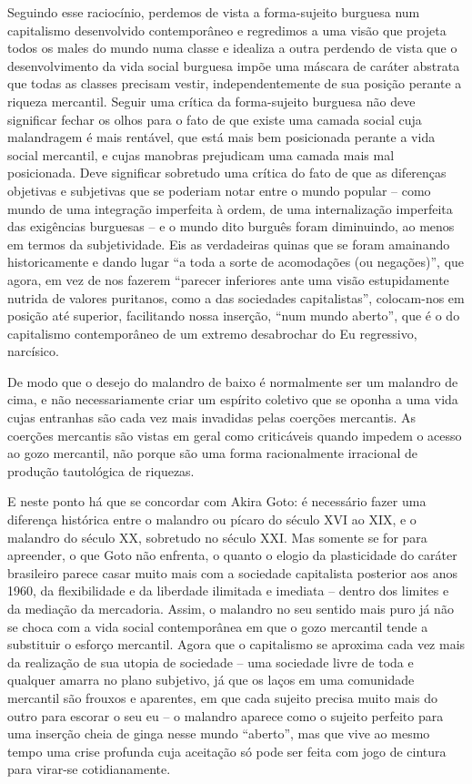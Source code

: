 Seguindo esse raciocínio, perdemos de vista a forma-sujeito burguesa num
capitalismo desenvolvido contemporâneo e regredimos a uma visão que
projeta todos os males do mundo numa classe e idealiza a outra perdendo
de vista que o desenvolvimento da vida social burguesa impõe uma máscara
de caráter abstrata que todas as classes precisam vestir,
independentemente de sua posição perante a riqueza mercantil. Seguir uma
crítica da forma-sujeito burguesa não deve significar fechar os olhos
para o fato de que existe uma camada social cuja malandragem é mais
rentável, que está mais bem posicionada perante a vida social mercantil,
e cujas manobras prejudicam uma camada mais mal posicionada. Deve
significar sobretudo uma crítica do fato de que as diferenças objetivas
e subjetivas que se poderiam notar entre o mundo popular -- como mundo
de uma integração imperfeita à ordem, de uma internalização imperfeita
das exigências burguesas -- e o mundo dito burguês foram diminuindo, ao
menos em termos da subjetividade. Eis as verdadeiras quinas que se foram
amainando historicamente e dando lugar ``a toda a sorte de acomodações
(ou negações)'', que agora, em vez de nos fazerem ``parecer inferiores
ante uma visão estupidamente nutrida de valores puritanos, como a das
sociedades capitalistas'', colocam-nos em posição até superior,
facilitando nossa inserção, ``num mundo aberto'', que é o do capitalismo
contemporâneo de um extremo desabrochar do Eu regressivo, narcísico.

De modo que o desejo do malandro de baixo é normalmente ser um malandro
de cima, e não necessariamente criar um espírito coletivo que se oponha
a uma vida cujas entranhas são cada vez mais invadidas pelas coerções
mercantis. As coerções mercantis são vistas em geral como criticáveis
quando impedem o acesso ao gozo mercantil, não porque são uma forma
racionalmente irracional de produção tautológica de riquezas.

E neste ponto há que se concordar com Akira Goto: é necessário fazer uma
diferença histórica entre o malandro ou pícaro do século XVI ao XIX, e o
malandro do século XX, sobretudo no século XXI. Mas somente se for para
apreender, o que Goto não enfrenta, o quanto o elogio da plasticidade do
caráter brasileiro parece casar muito mais com a sociedade capitalista
posterior aos anos 1960, da flexibilidade e da liberdade ilimitada e
imediata -- dentro dos limites e da mediação da mercadoria. Assim, o
malandro no seu sentido mais puro já não se choca com a vida social
contemporânea em que o gozo mercantil tende a substituir o esforço
mercantil. Agora que o capitalismo se aproxima cada vez mais da
realização de sua utopia de sociedade -- uma sociedade livre de toda e
qualquer amarra no plano subjetivo, já que os laços em uma comunidade
mercantil são frouxos e aparentes, em que cada sujeito precisa muito
mais do outro para escorar o seu eu -- o malandro aparece como o sujeito
perfeito para uma inserção cheia de ginga nesse mundo ``aberto'', mas
que vive ao mesmo tempo uma crise profunda cuja aceitação só pode ser
feita com jogo de cintura para virar-se cotidianamente.

